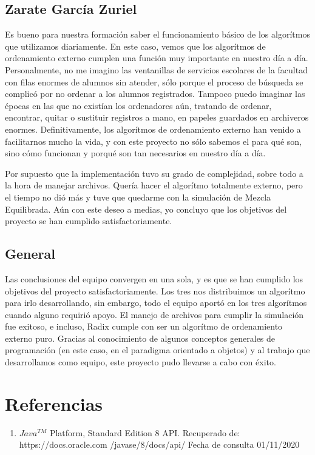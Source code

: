 \documentclass[12pt, letterpaper]{report}
\begin{document}
    
    
    \subsection*{Zarate García Zuriel}
    Es bueno para nuestra formación saber el funcionamiento básico de los algorítmos que utilizamos diariamente. En este caso, vemos que los algorítmos de ordenamiento externo cumplen una función muy importante en nuestro día a día. Personalmente, no me imagino las ventanillas de servicios escolares de la facultad con filas enormes de alumnos sin atender, sólo porque el proceso de búsqueda se complicó por no ordenar a los alumnos registrados. Tampoco puedo imaginar las épocas en las que no existían los ordenadores aún, tratando de ordenar, encontrar, quitar o sustituir registros a mano, en papeles guardados en archiveros enormes. Definitivamente, los algorítmos de ordenamiento externo han venido a facilitarnos mucho la vida, y con este proyecto no sólo sabemos el para qué son, sino cómo funcionan y porqué son tan necesarios en nuestro día a día. 
    
    Por supuesto que la implementación tuvo su grado de complejidad, sobre todo a la hora de manejar archivos. Quería hacer el algorítmo totalmente externo, pero el tiempo no dió más y tuve que quedarme con la simulación de Mezcla Equilibrada. Aún con este deseo a medias, yo concluyo que los objetivos del proyecto se han cumplido satisfactoriamente.
    
    \subsection*{General} 
    Las conclusiones del equipo convergen en una sola, y es que se han cumplido los objetivos del proyecto satisfactoriamente. Los tres nos distribuimos un algorítmo para irlo desarrollando, sin embargo, todo el equipo aportó en los tres algorítmos cuando alguno requirió apoyo. El manejo de archivos para cumplir la simulación fue exitoso, e incluso, Radix cumple con ser un algorítmo de ordenamiento externo puro. Gracias al conocimiento de algunos conceptos generales de programación (en este caso, en el paradigma orientado a objetos) y al trabajo que desarrollamos como equipo, este proyecto pudo llevarse a cabo con éxito. 
    
    \section*{Referencias}

\begin{enumerate}
  \item
  $Java^{TM}$ Platform, Standard Edition 8 API. Recuperado de: https://docs.oracle.com /javase/8/docs/api/ Fecha de consulta 01/11/2020
\end{enumerate}
\end{document}

